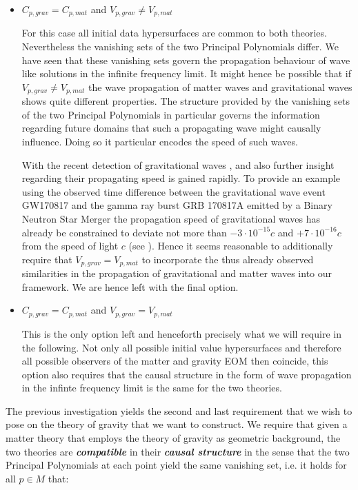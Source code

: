 \documentclass[a4paper,12pt, DIV=14, BCOR=5mm, twoside, headsepline, numbers=noenddot]{scrbook}
\begin{document}
\begin{itemize}
\item $C_{p,grav} = C_{p,mat}$ and $V_{p,grav} \neq V_{p,mat}$ 

For this case all initial data hypersurfaces are common to both theories. Nevertheless the vanishing sets of the two Principal Polynomials differ. We have seen that these vanishing sets govern the propagation behaviour of wave like solutions in the infinite frequency limit. It might hence be possible that if $V_{p,grav} \neq V_{p,mat}$ the wave propagation of matter waves and gravitational waves shows quite different properties. The structure provided by the vanishing sets of the two Principal Polynomials in particular governs the information regarding future domains that such a propagating wave might causally influence. Doing so it particular encodes the speed of such waves. 

With the recent detection of gravitational waves \cite{2017ApJ...848L..12A}, \cite{2017PhRvL.119n1101A} and \cite{2016PhRvL.116f1102A} also further insight regarding their propagating speed is gained rapidly. 
To provide an example using the observed time difference between the gravitational wave event GW170817 and the gamma ray burst GRB 170817A emitted by a Binary Neutron Star Merger the propagation speed of gravitational waves has already be constrained to deviate not more than $-3\cdot 10^{{-}15}c$ and $+7\cdot 10^{{-}16}c$ from the speed of light $c$ (see \cite{2017ApJ...848L..13A}). Hence it seems reasonable to additionally require that $V_{p,grav} = V_{p,mat}$ to incorporate the thus already observed similarities in the propagation of gravitational and matter waves into our framework. We are hence left with the final option.
\item $C_{p,grav} = C_{p,mat}$ and $V_{p,grav} = V_{p,mat}$ 

This is the only option left and henceforth precisely what we will require in the following. Not only all possible initial value hypersurfaces and therefore all possible observers of the matter and gravity EOM then coincide, this option also requires that the causal structure in the form of wave propagation in the infinte frequency limit is the same for the two theories.  
\end{itemize}
The previous investigation yields the second and last requirement that we wish to pose on the theory of gravity that we want to construct. We require that given a matter theory that employs the theory of gravity as geometric background, the two theories are \textit{\textbf{compatible}} in their \textit{\textbf{causal structure}} in the sense that the two Principal Polynomials at each point yield the same vanishing set, i.e. it holds for all $p \in M$ that: 
\end{document}
